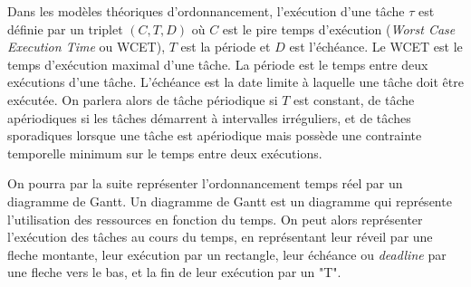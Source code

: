 Dans les modèles théoriques d'ordonnancement, l'exécution d'une tâche $\tau$ est définie par un triplet $(C,T,D)$ où $C$ est le pire temps d'exécution (\textit{Worst Case Execution Time} ou WCET), $T$ est la période et $D$ est l'échéance. Le WCET est le temps d'exécution maximal d'une tâche. La période est le temps entre deux exécutions d'une tâche. L'échéance est la date limite à laquelle une tâche doit être exécutée. On parlera alors de tâche périodique si $T$ est constant, de tâche apériodiques si les tâches démarrent à intervalles irréguliers, et de tâches sporadiques lorsque une tâche est apériodique mais possède une contrainte temporelle minimum sur le temps entre deux exécutions.

On pourra par la suite représenter l'ordonnancement temps réel par un diagramme de Gantt. Un diagramme de Gantt est un diagramme qui représente l'utilisation des ressources en fonction du temps. On peut alors représenter l'exécution des tâches au cours du temps, en représentant leur réveil par une fleche montante, leur exécution par un rectangle, leur échéance ou \textit{deadline} par une fleche vers le bas, et la fin de leur exécution par un "T". 

